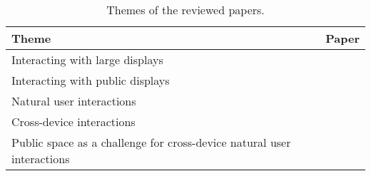 \begin{table}[h!]
\centering
\begin{tabular}{@{}p{5cm}p{3cm}@{}}
\toprule[2pt]
Theme & Paper \\\midrule[2pt] 
Interacting with large displays      & \cite{Weiser:1991} \cite{Hinrichs:2013:IPD:2478559.2478965} \cite{Wellner:1993} \cite{Buxton:2000}  \cite{Czerwinski:2003}\\\midrule%
Interacting with public displays      & \cite{Brignull:2003} \cite{Ojala:2012:MIP:2225044.2225065} \cite{Schieck:2012:AEM:2393132.2393141} \cite{Boring:2013} \cite{Jacucci:2010} \cite{Ren:2013} \cite{Lucero:2012} \cite{Valkanova:2014} \cite{Huang:2003} \\\midrule%
Natural user interactions      & \cite{Jain:2011}\cite{Keefe:2001} \cite{Vogel:2005} \cite{Aigner:2012} \cite{Karam:2005} \cite{Walter:2014} \cite{Wigdor:2011} \cite{Wilson:2010} \cite{KinectFiction:2010} \cite{KinnectPower:2012} \\\midrule%
Cross-device interactions      & \cite{Levin:2014}\cite{Scharf:2013} \cite{Rekimoto:1997} \cite{Hamilton:2014} \cite{Radle:2015} \cite{Schmidt:2012} \cite{Boring:2009} \cite{Skov:2015} \\\midrule%
Public space as a challenge for cross-device natural user interactions      & \cite{carr:1992} \cite{Brignull:2003} \cite{Cheung:2014} \cite{Greenberg:2011} \cite{Marquardt:2011} \cite{Marquardt:2012} \cite{Seifert:2012} \cite{Bragton:2011} \\%
\bottomrule
\end{tabular}
\caption{Themes of the reviewed papers.}
\label{tab:themes}
\end{table}







